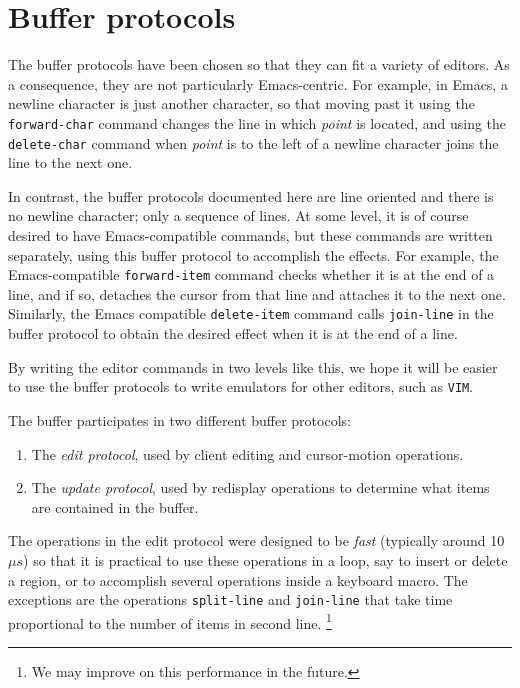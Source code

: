\chapter{Buffer protocols}
\label{chap-buffer-protocols}

The buffer protocols have been chosen so that they can fit a variety
of editors.  As a consequence, they are not particularly
Emacs-centric.  For example, in Emacs, a newline character is just
another character, so that moving past it using the
\texttt{forward-char} command changes the line in which \emph{point}
is located, and using the \texttt{delete-char} command when
\emph{point} is to the left of a newline character joins the line to
the next one.

In contrast, the buffer protocols documented here are line oriented
and there is no newline character; only a sequence of lines.  At some
level, it is of course desired to have Emacs-compatible commands, but
these commands are written separately, using this buffer protocol to
accomplish the effects.  For example, the Emacs-compatible
\texttt{forward-item} command checks whether it is at the end of a
line, and if so, detaches the cursor from that line and attaches it to
the next one.  Similarly, the Emacs compatible \texttt{delete-item}
command calls \texttt{join-line} in the buffer protocol to obtain the
desired effect when it is at the end of a line.

By writing the editor commands in two levels like this, we hope it
will be easier to use the buffer protocols to write emulators for
other editors, such as \texttt{VIM}.

The buffer participates in two different buffer protocols:

\begin{enumerate}
\item The \emph{edit protocol}, used by client editing and
  cursor-motion operations.
\item The \emph{update protocol}, used by redisplay operations to
  determine what items are contained in the buffer. 
\end{enumerate}

The operations in the edit protocol were designed to be \emph{fast}
(typically around 10 $\mu s$) so that it is practical to use these
operations in a loop, say to insert or delete a region, or to
accomplish several operations inside a keyboard macro.  The exceptions
are the operations \texttt{split-line} and \texttt{join-line} that
take time proportional to the number of items in second line.%
\footnote{We may improve on this performance in the future.}

